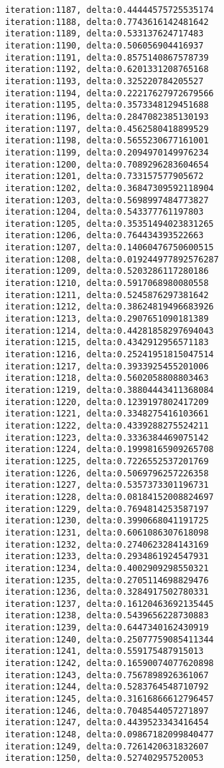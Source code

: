 \documentclass[11pt]{article}
\begin{document}
\begin{Verbatim}[commandchars=\\\{\}]
iteration:1187, delta:0.44444575725535174
iteration:1188, delta:0.7743616142481642
iteration:1189, delta:0.533137624717483
iteration:1190, delta:0.506056904416937
iteration:1191, delta:0.8575140867578739
iteration:1192, delta:0.6201331208765168
iteration:1193, delta:0.325220784205527
iteration:1194, delta:0.22217627972679566
iteration:1195, delta:0.3573348129451688
iteration:1196, delta:0.2847082385130193
iteration:1197, delta:0.4562580418899529
iteration:1198, delta:0.5655230677161001
iteration:1199, delta:0.2094970149976234
iteration:1200, delta:0.7089296283604654
iteration:1201, delta:0.733157577905672
iteration:1202, delta:0.36847309592118904
iteration:1203, delta:0.5698997484773827
iteration:1204, delta:0.543377761197803
iteration:1205, delta:0.35351494023831265
iteration:1206, delta:0.764434393522663
iteration:1207, delta:0.14060476750600515
iteration:1208, delta:0.019244977892576287
iteration:1209, delta:0.5203286117280186
iteration:1210, delta:0.5917068980080558
iteration:1211, delta:0.5245876297381642
iteration:1212, delta:0.38624819496683926
iteration:1213, delta:0.2907651090181389
iteration:1214, delta:0.44281858297694043
iteration:1215, delta:0.4342912956571183
iteration:1216, delta:0.25241951815047514
iteration:1217, delta:0.3933925455201006
iteration:1218, delta:0.5602058808803463
iteration:1219, delta:0.38804443411368084
iteration:1220, delta:0.1239197802417209
iteration:1221, delta:0.3348275416103661
iteration:1222, delta:0.4339288275524211
iteration:1223, delta:0.3336384469075142
iteration:1224, delta:0.19998165909265708
iteration:1225, delta:0.7226552537201769
iteration:1226, delta:0.5069796257226358
iteration:1227, delta:0.5357373301196731
iteration:1228, delta:0.08184152008824697
iteration:1229, delta:0.7694814253587197
iteration:1230, delta:0.3990668041191725
iteration:1231, delta:0.6061086307618098
iteration:1232, delta:0.2740623284143169
iteration:1233, delta:0.2934861924547931
iteration:1234, delta:0.4002909298550321
iteration:1235, delta:0.2705114698829476
iteration:1236, delta:0.3284917502780331
iteration:1237, delta:0.16120463692135445
iteration:1238, delta:0.5439656228730883
iteration:1239, delta:0.6447340162430919
iteration:1240, delta:0.25077759085411344
iteration:1241, delta:0.559175487915013
iteration:1242, delta:0.16590074077620898
iteration:1243, delta:0.7567898926361067
iteration:1244, delta:0.5283764548710792
iteration:1245, delta:0.31616866612796457
iteration:1246, delta:0.7048544057271897
iteration:1247, delta:0.4439523343416454
iteration:1248, delta:0.09867182099840477
iteration:1249, delta:0.7261420631832607
iteration:1250, delta:0.527402957520053

\end{Verbatim}
\end{document}
